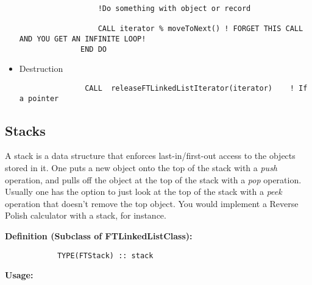\documentclass[9pt]{article}
\begin{document}
\begin{itemize}
{\begin{verbatim}
                  !Do something with object or record

                  CALL iterator % moveToNext() ! FORGET THIS CALL AND YOU GET AN INFINITE LOOP!
              END DO
\end{verbatim}}

         \item Destruction

{\color{blue}\begin{verbatim}
               CALL  releaseFTLinkedListIterator(iterator)    ! If a pointer
\end{verbatim}}
\end{itemize}

\subsection{Stacks}
A stack is a data structure that enforces last-in/first-out access to the objects stored in it. One puts
a new object onto the top of the stack with a \emph{push} operation, and pulls off the object at the
top of the stack with a \emph{pop} operation. Usually one has the option to just look at the top of 
the stack with a \emph{peek} operation that doesn't remove the top object. You would implement a 
Reverse Polish calculator with a stack, for instance.

     {\bf Definition (Subclass of FTLinkedListClass):}
	{\color{blue}\begin{verbatim}
        	TYPE(FTStack) :: stack
	\end{verbatim}}
     {\bf Usage:}
\end{document}
